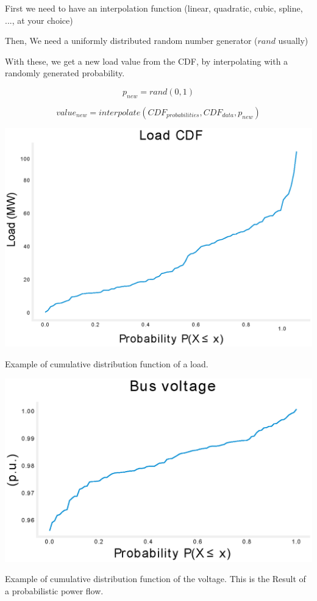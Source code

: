\documentclass[nols,a4paper,twoside,notoc,fleqn]{tufte-book}
\begin{document}
First we need to have an interpolation function (linear, quadratic, cubic, spline, ..., at your choice)

Then, We need a uniformly distributed random number generator ($rand$ usually)

With these, we get a new load value from the CDF, by interpolating with a randomly generated probability.

$$
p_{new} = rand(0, 1)
$$

$$
value_{new} = interpolate(CDF_{probabilities}, CDF_{data}, p_{new})
$$

\begin{marginfigure}
	\includegraphics[width=\linewidth]{img/Load_CDF.eps}
	\caption{Example of cumulative distribution function of a load.}
	\label{fig:load_CDF}
\end{marginfigure}

\begin{marginfigure}
	\includegraphics[width=\linewidth]{img/Voltage_CDF.eps}
	\caption{Example of cumulative distribution function of the voltage. This is the Result of a probabilistic power flow.}
	\label{fig:Voltage_CDF}
\end{marginfigure}
\end{document}
